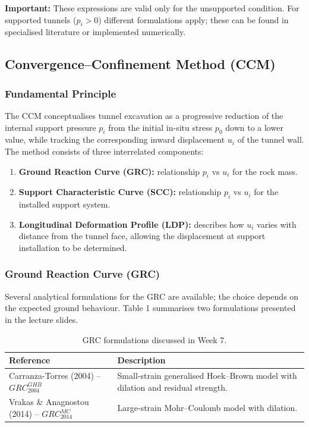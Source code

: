 \documentclass[a4paper,12pt]{article}
\begin{document}
\textbf{Important:} These expressions are valid only for the unsupported condition. For supported tunnels ($p_i > 0$) different formulations apply; these can be found in specialised literature or implemented numerically.

\subsection{Convergence--Confinement Method (CCM)}

\subsubsection{Fundamental Principle}
The CCM conceptualises tunnel excavation as a progressive reduction of the internal support pressure $p_i$ from the initial in-situ stress $p_0$ down to a lower value, while tracking the corresponding inward displacement $u_i$ of the tunnel wall. The method consists of three interrelated components:
\begin{enumerate}[leftmargin=*]
    \item \textbf{Ground Reaction Curve (GRC):} relationship $p_i$ vs $u_i$ for the rock mass.
    \item \textbf{Support Characteristic Curve (SCC):} relationship $p_i$ vs $u_i$ for the installed support system.
    \item \textbf{Longitudinal Deformation Profile (LDP):} describes how $u_i$ varies with distance from the tunnel face, allowing the displacement at support installation to be determined.
\end{enumerate}

\subsubsection{Ground Reaction Curve (GRC)}
Several analytical formulations for the GRC are available; the choice depends on the expected ground behaviour. Table 1 summarises two formulations presented in the lecture slides.

\begin{table}[h!]
\centering
\begin{tabularx}{\textwidth}{l X}
\toprule
\textbf{Reference} & \textbf{Description} \\
\midrule
Carranza-Torres (2004) -- $GRC_{2004}^{GHB}$ & Small-strain generalised Hoek--Brown model with dilation and residual strength. \\
Vrakas \& Anagnostou (2014) -- $GRC_{2014}^{MC}$ & Large-strain Mohr--Coulomb model with dilation. \\
\bottomrule
\end{tabularx}
\caption{GRC formulations discussed in Week 7.}
\end{table}
\end{document}

